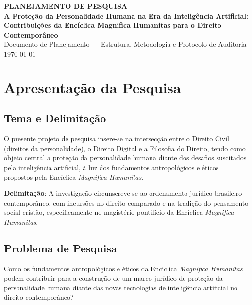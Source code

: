 \documentclass[12pt,a4paper]{article}
\begin{document}
\begin{titlepage}
\begin{center}
\vspace*{3cm}
{\Large\textbf{PLANEJAMENTO DE PESQUISA}}\\[1.5cm]
{\LARGE\textbf{A Proteção da Personalidade Humana na Era da Inteligência Artificial: Contribuições da Encíclica Magnifica Humanitas para o Direito Contemporâneo}}\\[2cm]
{\large Documento de Planejamento --- Estrutura, Metodologia e Protocolo de Auditoria}\\[1cm]
\vfill
{\large \today}
\end{center}
\end{titlepage}

\newpage
\tableofcontents
\newpage

\section{Apresentação da Pesquisa}

\subsection{Tema e Delimitação}

O presente projeto de pesquisa insere-se na intersecção entre o Direito Civil (direitos da personalidade), o Direito Digital e a Filosofia do Direito, tendo como objeto central a proteção da personalidade humana diante dos desafios suscitados pela inteligência artificial, à luz dos fundamentos antropológicos e éticos propostos pela Encíclica \textit{Magnifica Humanitas}.

\textbf{Delimitação}: A investigação circunscreve-se ao ordenamento jurídico brasileiro contemporâneo, com incursões no direito comparado e na tradição do pensamento social cristão, especificamente no magistério pontifício da Encíclica \textit{Magnifica Humanitas}.

\subsection{Problema de Pesquisa}

Como os fundamentos antropológicos e éticos da Encíclica \textit{Magnifica Humanitas} podem contribuir para a construção de um marco jurídico de proteção da personalidade humana diante das novas tecnologias de inteligência artificial no direito contemporâneo?
\end{document}
